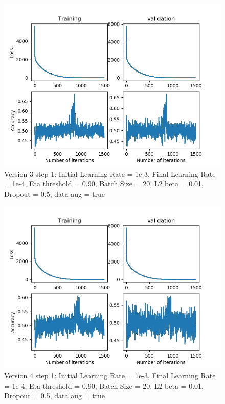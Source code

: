 \documentclass[12pt,reqno]{amsart}
\numberwithin{equation}{section}
\begin{document}
\begin{enumerate}
\begin{figure}[H]
\centering
\includegraphics[scale=0.6]{data_liquid5_version3_step1}
\caption{Version 3 step 1: Initial Learning Rate = 1e-3, Final Learning Rate = 1e-4, Eta threshold = 0.90, Batch Size = 20, L2 beta = 0.01, Dropout = 0.5, data aug = true}
\end{figure}

\begin{figure}[H]
\centering
\includegraphics[scale=0.6]{data_liquid5_version4_step1}
\caption{Version 4 step 1: Initial Learning Rate = 1e-3, Final Learning Rate = 1e-4, Eta threshold = 0.90, Batch Size = 20, L2 beta = 0.01, Dropout = 0.5, data aug = true}
\end{figure}


\end{enumerate}
\end{document}
